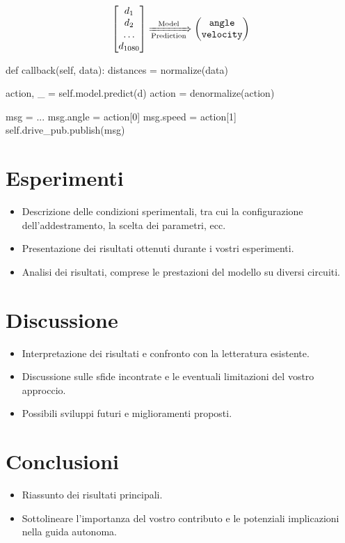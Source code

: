 \documentclass[conference]{IEEEtran}
\begin{document}
\begin{equation*}
\begin{bmatrix}
    d_1\\
    d_2\\
    \dots\\
    d_{1080}
\end{bmatrix}
\xRightarrow[\text{Prediction}]{\text{Model}}
\begin{pmatrix}
    \texttt{angle}\\
    \texttt{velocity}
\end{pmatrix}
\end{equation*}

\begin{python}
def callback(self, data):
  distances = normalize(data)

  action, _ = self.model.predict(d)
  action = denormalize(action)

  msg = ...
  msg.angle = action[0]
  msg.speed = action[1]
  self.drive_pub.publish(msg)
\end{python}

%
%
%
\section{Esperimenti}

\begin{itemize}
    \item Descrizione delle condizioni sperimentali, tra cui la configurazione dell'addestramento, la scelta dei parametri, ecc.

    \item Presentazione dei risultati ottenuti durante i vostri esperimenti.

    \item Analisi dei risultati, comprese le prestazioni del modello su diversi circuiti.

\end{itemize}

\section{Discussione}

\begin{itemize}
    \item Interpretazione dei risultati e confronto con la letteratura esistente.

    \item Discussione sulle sfide incontrate e le eventuali limitazioni del vostro approccio.

    \item Possibili sviluppi futuri e miglioramenti proposti.

\end{itemize}

\section{Conclusioni}

\begin{itemize}
    \item Riassunto dei risultati principali.

    \item Sottolineare l'importanza del vostro contributo e le potenziali implicazioni nella guida autonoma.

\end{itemize}



\end{document}
